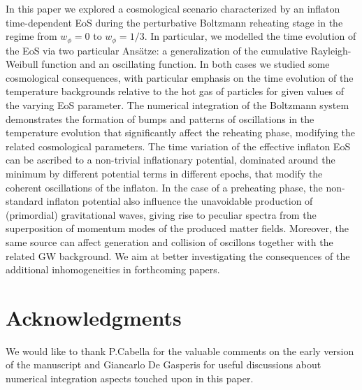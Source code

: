 \documentclass[%
aps,prd,nofootinbib,showkeys,a4paper,10pt
]{revtex4-2}
\begin{document}
In this paper we explored a cosmological scenario characterized by an inflaton time-dependent EoS during
the perturbative Boltzmann reheating stage in the regime from $w_{\phi}=0$ to $w_{\phi}=1/3$.
In particular, we modelled the time evolution of the EoS via two particular Ans\"atze: a generalization of the cumulative Rayleigh-Weibull function and an oscillating function.
In both cases we studied some cosmological consequences, with particular emphasis on the time evolution
of the temperature backgrounds relative to the hot gas of particles for given values of the varying EoS parameter.
The numerical integration of the Boltzmann system demonstrates the formation of bumps and patterns of oscillations 
in the temperature evolution that significantly affect the reheating phase, modifying the related cosmological parameters.
The time variation of the effective inflaton EoS can be ascribed to a non-trivial inflationary potential, dominated around the minimum 
by different potential terms in different epochs, that modify the coherent oscillations of the inflaton.  
In the case of a preheating phase, 
the non-standard inflaton potential also influence the unavoidable production of (primordial) gravitational waves, 
giving rise to peculiar spectra from the superposition of momentum modes of the produced matter fields. 
Moreover, the same source can affect generation and collision of oscillons together with the related GW background.
We aim at better investigating the consequences of the additional inhomogeneities in forthcoming papers. 






\section*{Acknowledgments}

We would like to thank P.Cabella for the valuable comments on the early version of the manuscript and
Giancarlo De Gasperis for useful discussions about numerical integration aspects touched upon in this paper.




\end{document}
